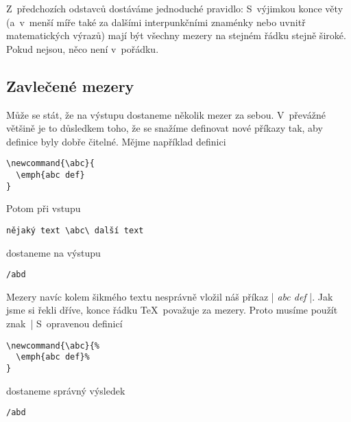 \documentclass{csbulletin}
\def\emph#1{{\sl#1\/}}
\begin{document}
Z~předchozích odstavců dostáváme jednoduché pravidlo: S~výjimkou konce věty (a~v~menší míře také za dalšími interpunkčními znaménky nebo uvnitř matematických výrazů) mají být všechny mezery na stejném řádku stejně široké. Pokud nejsou, něco není v~pořádku.

\subsection{Zavlečené mezery}

Může se stát, že na výstupu dostaneme několik mezer za sebou. V~převážné většině je to důsledkem toho, že se snažíme definovat nové příkazy tak, aby definice byly dobře čitelné. Mějme například definici
\begin{Verbatim}
\newcommand{\abc}{
  \emph{abc def}
}
\end{Verbatim}
Potom při vstupu
\begin{Verbatim}
nějaký text \abc\ další text
\end{Verbatim}
dostaneme na výstupu
\begingroup
\newcommand{\abc}{
  \emph{abc def}
}%
\def\abd{\hbox{\rm
nějaký text \abc\ další text
  \unskip}}%
\begin{Verbatim}[commandchars=/()]
/abd
\end{Verbatim}
\endgroup
\noindent
Mezery navíc kolem šikmého textu nesprávně vložil náš příkaz |\abc|. Jak jsme si řekli dříve, konce řádku \TeX\ považuje za mezery. Proto musíme použít znak~|%
S~opravenou definicí
\begin{Verbatim}
\newcommand{\abc}{%
  \emph{abc def}%
}
\end{Verbatim}
dostaneme správný výsledek
\begingroup
\newcommand{\abc}{%
  \emph{abc def}%
}%
\def\abd{\hbox{\rm
nějaký text \abc\ další text
  \unskip}}%
\begin{Verbatim}[commandchars=/()]
/abd
\end{Verbatim}
\endgroup
\end{document}
